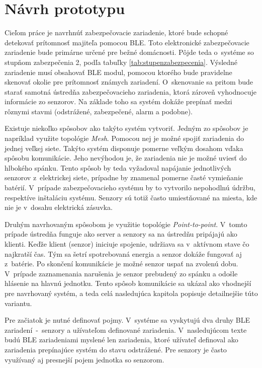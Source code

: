 \chapter{Návrh prototypu}

Cieľom práce je navrhnúť zabezpečovacie zariadenie, ktoré bude schopné detekovať prítomnosť majiteľa pomocou BLE. Toto elektronické zabezpečovacie zariadenie bude primárne určené pre bežné domácnosti. Pôjde teda o~systéme so stupňom zabezpečenia 2, podľa tabuľky \ref{tab:stupenzabezpecenia}. Výsledné zariadenie musí obsahovať BLE modul, pomocou ktorého bude pravidelne skenovať okolie pre prítomnosť známych zariadení. O~skenovanie sa pritom bude starať samotná ústredňa zabezpečovacieho zariadenia, ktorá zároveň vyhodnocuje informácie zo senzorov. Na základe toho sa systém dokáže prepínať medzi rôznymi stavmi (odstrážené, zabezpečené, alarm a podobne).

Existuje niekoľko spôsobov ako takýto systém vytvoriť. Jedným zo spôsobov je napríklad využite topológie \textit{Mesh}. Pomocou nej je možné spojiť zariadenia do jednej veľkej siete. Takýto systém disponuje pomerne veľkým dosahom vďaka spôsobu komunikácie. Jeho nevýhodou je, že zariadenia nie je možné uviesť do hlbokého spánku. Tento spôsob by teda vyžadoval napájanie jednotlivých senzorov z~elektrickej siete, prípadne by znamenal pomerne časté vymieňanie batérií. V~prípade zabezpečovacieho systému by to vytvorilo nepohodlnú údržbu, respektíve inštaláciu systému. Senzory sú totiž často umiestňované na miesta, kde nie je v~dosahu elektrická zásuvka.

Druhým navrhovaným spôsobom je využitie topológie \textit{Point-to-point}. V~tomto prípade ústredňa funguje ako server a senzory sa na ústredňu pripájajú ako klienti. Keďže klient (senzor) iniciuje spojenie, udržiava sa v~aktívnom stave čo najkratší čas. Tým sa šetrí spotrebovaná energia a senzor dokáže fungovať aj z~batérie. Po skončení komunikácie je možné senzor uspať na zvolenú dobu. V~prípade zaznamenania narušenia je senzor prebudený zo spánku a odošle hlásenie na hlavnú jednotku. Tento spôsob komunikácie sa ukázal ako vhodnejší pre navrhovaný systém, a teda celá nasledujúca kapitola popisuje detailnejšie túto variantu.

Pre začiatok je nutné definovať pojmy. V~systéme sa vyskytujú dva druhy BLE zariadení~-~senzory a užívateľom definované zariadenia. V~nasledujúcom texte budú BLE zariadeniami myslené len zariadenia, ktoré užívateľ definoval ako zariadenia prepínajúce systém do stavu odstrážené. Pre senzory je často využívaný aj presnejší pojem jednotka so senzorom.


